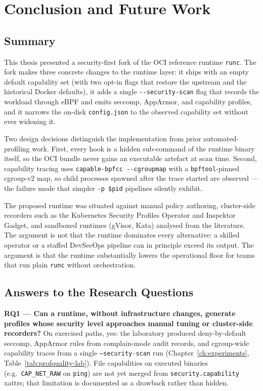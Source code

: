 
\chapter{Conclusion and Future Work}\label{ch:conclusion}

\section{Summary}

This thesis presented a security-first fork of the OCI reference runtime \texttt{runc}. The fork makes three concrete changes to the runtime layer: it ships with an empty default capability set (with two opt-in flags that restore the upstream and the historical Docker defaults), it adds a single \texttt{-{}-security-scan} flag that records the workload through eBPF and emits seccomp, AppArmor, and capability profiles, and it narrows the on-disk \texttt{config.json} to the observed capability set without ever widening it.

Two design decisions distinguish the implementation from prior automated-profiling work. First, every hook is a hidden sub-command of the runtime binary itself, so the OCI bundle never gains an executable artefact at scan time. Second, capability tracing uses \texttt{capable-bpfcc -{}-cgroupmap} with a \texttt{bpftool}-pinned cgroup-v2 map, so child processes spawned after the trace started are observed --- the failure mode that simpler \texttt{-p \$pid} pipelines silently exhibit.

The proposed runtime was situated against manual policy authoring, cluster-side recorders such as the Kubernetes Security Profiles Operator and Inspektor Gadget, and sandboxed runtimes (gVisor, Kata) analysed from the literature. The argument is not that the runtime dominates every alternative: a skilled operator or a staffed DevSecOps pipeline can in principle exceed its output. The argument is that the runtime substantially lowers the operational floor for teams that run plain \texttt{runc} without orchestration.

\section{Answers to the Research Questions}

\textbf{RQ1 --- Can a runtime, without infrastructure changes, generate profiles whose security level approaches manual tuning or cluster-side recorders?} On exercised paths, yes: the laboratory produced deny-by-default seccomp, AppArmor rules from complain-mode audit records, and cgroup-wide capability traces from a single \texttt{--security-scan} run (Chapter~\ref{ch:experiments}, Table~\ref{tab:profquality-lab}). File capabilities on executed binaries (e.g.\ \texttt{CAP\_NET\_RAW} on \texttt{ping}) are not yet merged from \texttt{security.capability} xattrs; that limitation is documented as a drawback rather than hidden.

